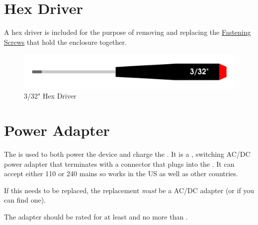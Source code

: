\section{Hex Driver} \label{Hex Driver}

A  hex driver is included for the purpose of removing and replacing
the \hyperref[Fastening Screws]{Fastening Screws} that hold the enclosure
together.

\begin{figure}[H]
\centering
  \includegraphics{images/hex_driver.png}
\caption{3/32" Hex Driver}
\end{figure}


\section{Power Adapter} \label{Power Adapter}

The  is used to both power the device
and charge the \hyperref[Rechargeable Battery]{}.  It is a
,  switching AC/DC power adapter
that terminates with a  connector that plugs into the
\hyperref[Power Port]{}.  It can accept either \num{110} or \num{240}
 mains so works in the US as well as other countries.

\par\medskip

If this needs to be replaced, the replacement \textit{must} be a
 AC/DC adapter (or  if you can find
one).



The adapter should be rated for at least  and no more than
.

